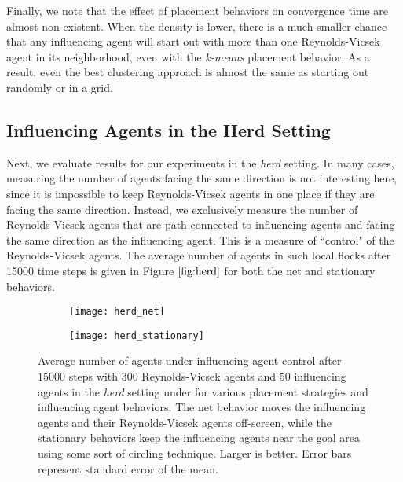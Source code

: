 Finally, we note that the effect of placement behaviors on convergence time
are almost non-existent.
When the density is lower, there is a much smaller chance that any influencing
agent will start out with more than one Reynolds-Vicsek agent in its
neighborhood, even with the \textit{k-means} placement behavior.
As a result, even the best clustering approach is almost the same as starting
out randomly or in a grid.

\subsection{Influencing Agents in the Herd Setting}

Next, we evaluate results for our experiments in the \textit{herd} setting.
In many cases, measuring the number of agents facing the same direction is not
interesting here, since it is impossible to keep Reynolds-Vicsek agents in one place
if they are facing the same direction.
Instead, we exclusively measure the number of Reynolds-Vicsek agents that are
path-connected to influencing agents and facing the same direction as the influencing
agent.
This is a measure of ``control" of the Reynolds-Vicsek agents.
The average number of agents in such local flocks after 15000 time steps is given
in Figure $\ref{fig:herd}$ for both the net and stationary behaviors.
\begin{figure}
    \centering
    \begin{subfigure}[b]{\textwidth}
        \texttt{[image: herd\_net]}
    \end{subfigure}
    \begin{subfigure}[b]{\textwidth}
        \texttt{[image: herd\_stationary]}
    \end{subfigure}
    \caption{Average number of agents under influencing agent control after $15000$
    steps with $300$ Reynolds-Vicsek agents and $50$ influencing agents in the
    \textit{herd} setting under for various placement strategies
    and influencing agent behaviors.
    The net behavior moves the influencing agents and their Reynolds-Vicsek agents
    off-screen, while the stationary behaviors keep the influencing agents near
    the goal area using some sort of circling technique.
    Larger is better.
    Error bars represent standard error of the mean.}
    \label{fig:herd}
\end{figure}
